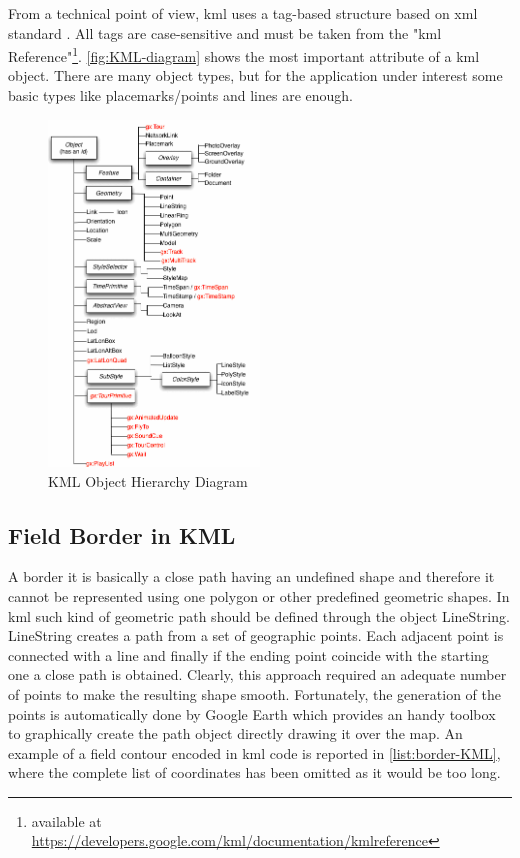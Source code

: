 From a technical point of view, \acrshort{kml} uses a tag-based structure based on \acrshort{xml} standard \cite{bray06xml11}. All tags are case-sensitive and must be taken from the "\acrshort{kml} Reference"\footnote{available at \url{https://developers.google.com/kml/documentation/kmlreference}}. \autoref{fig:KML-diagram} shows the most important attribute of a \acrshort{kml} object. There are many object types, but for the application under interest some basic types like placemarks/points and lines are enough.
\begin{figure}[H]
    \centering
    \includegraphics[width=0.5\textwidth]{figures/C2/KML-classTree.png}
    \caption{KML Object Hierarchy Diagram}
    \label{fig:KML-diagram}
\end{figure}
\subsection{Field Border in KML} %
\label{sub:field_border_in_kml}
A border it is basically a close path having an undefined shape and therefore it cannot be represented using one polygon or other predefined geometric shapes. In \acrshort{kml} such kind of geometric path should be defined through the object \textsf{LineString}. \textsf{LineString} creates a path from a set of geographic points. Each adjacent point is connected with a line and finally if the ending point coincide with the starting one a close path is obtained. Clearly, this approach required an adequate number of points to make the resulting shape smooth. Fortunately, the generation of the points is automatically done by Google Earth which provides an handy toolbox to graphically create the path object directly drawing it over the map.
An example of a field contour encoded in \acrshort{kml} code is reported in \autoref{list:border-KML}, where the complete list of coordinates has been omitted as it would be too long.
\begin{Code}

\end{Code}

